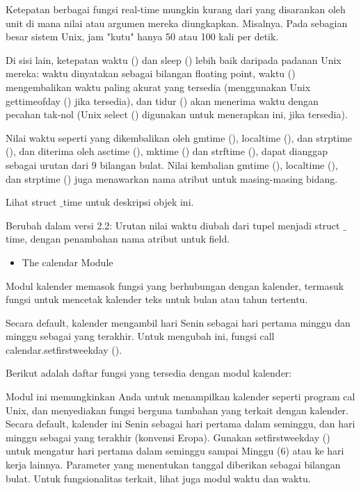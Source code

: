 \vspace{12pt}
\noindent 
Ketepatan berbagai fungsi real-time mungkin kurang dari yang disarankan oleh unit di mana nilai atau argumen mereka diungkapkan. Misalnya. Pada sebagian besar sistem Unix, jam "kutu" hanya 50 atau 100 kali per detik. \par
\vspace{12pt}
\noindent 
Di sisi lain, ketepatan waktu () dan sleep () lebih baik daripada padanan Unix mereka: waktu dinyatakan sebagai bilangan floating point, waktu () mengembalikan waktu paling akurat yang tersedia (menggunakan Unix gettimeofday () jika tersedia), dan tidur () akan menerima waktu dengan pecahan tak-nol (Unix select () digunakan untuk menerapkan ini, jika tersedia). \par
\vspace{12pt}
\noindent 
Nilai waktu seperti yang dikembalikan oleh gmtime (), localtime (), dan strptime (), dan diterima oleh asctime (), mktime () dan strftime (), dapat dianggap sebagai urutan dari 9 bilangan bulat. Nilai kembalian gmtime (), localtime (), dan strptime () juga menawarkan nama atribut untuk masing-masing bidang. \par
\vspace{12pt}
\noindent 
Lihat struct $  \_  $time untuk deskripsi objek ini. \par
\vspace{12pt}
\noindent 
Berubah dalam versi 2.2: Urutan nilai waktu diubah dari tupel menjadi struct $  \_  $time, dengan penambahan nama atribut untuk field. \par
\vspace{\baselineskip}
\noindent 
\begin{itemize}
\item The calendar Module
\end{itemize}
\noindent 
Modul kalender memasok fungsi yang berhubungan dengan kalender, termasuk fungsi untuk mencetak kalender teks untuk bulan atau tahun tertentu. \par
\noindent 
Secara default, kalender mengambil hari Senin sebagai hari pertama minggu dan minggu sebagai yang terakhir. Untuk mengubah ini, fungsi call calendar.setfirstweekday (). \par
\noindent 
Berikut adalah daftar fungsi yang tersedia dengan modul kalender: \par
\noindent 
Modul ini memungkinkan Anda untuk menampilkan kalender seperti program cal Unix, dan menyediakan fungsi berguna tambahan yang terkait dengan kalender. Secara default, kalender ini Senin sebagai hari pertama dalam seminggu, dan hari minggu sebagai yang terakhir (konvensi Eropa). Gunakan setfirstweekday () untuk mengatur hari pertama dalam seminggu sampai Minggu (6) atau ke hari kerja lainnya. Parameter yang menentukan tanggal diberikan sebagai bilangan bulat. Untuk fungsionalitas terkait, lihat juga modul waktu dan waktu. \par
